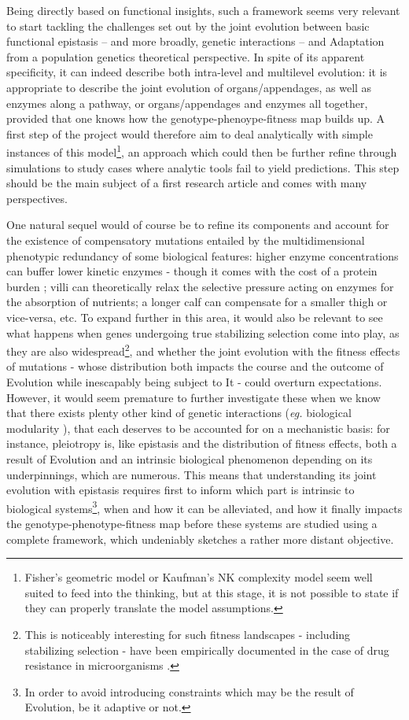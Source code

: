 \documentclass[11pt,onecolumn]{article}
\begin{document}
Being directly based on functional insights, such a framework seems very relevant to start tackling the challenges set out by the joint evolution between basic functional epistasis -- and more broadly, genetic interactions -- and Adaptation from a population genetics theoretical perspective. In spite of its apparent specificity, it can indeed describe both intra-level and multilevel evolution: it is appropriate to describe the joint evolution of organs/appendages, as well as enzymes along a pathway, or organs/appendages and enzymes all together, provided that one knows how the genotype-phenoype-fitness map builds up. A first step of the project would therefore aim to deal analytically with simple instances of this model\footnote{Fisher's geometric model or Kaufman's NK complexity model seem well suited to feed into the thinking, but at this stage, it is not possible to state if they can properly translate the model assumptions.}, an approach which could then be further refine through simulations to study cases where analytic tools fail to yield predictions. This step should be the main subject of a first research article and comes with many perspectives.

One natural sequel would of course be to refine its components and account for the existence of compensatory mutations entailed by the multidimensional phenotypic redundancy of some biological features: higher enzyme concentrations can buffer lower kinetic enzymes - though it comes with the cost of a protein burden \citep{Koch83,Dill11,Kafri16}; villi can theoretically relax the selective pressure acting on enzymes for the absorption of nutrients; a longer calf can compensate for a smaller thigh or vice-versa, etc. To expand further in this area, it would also be relevant to see what happens when genes undergoing true stabilizing selection come into play, as they are also widespread\footnote{This is noticeably interesting for such fitness landscapes - including stabilizing selection - have been empirically documented in the case of drug resistance in microorganisms \citep{Ford20}.}, and whether the joint evolution with the fitness effects of mutations - whose distribution both impacts the course and the outcome of Evolution while inescapably being subject to It - could overturn expectations. However, it would seem premature to further investigate these   when we know that there exists plenty other kind of genetic interactions (\textit{eg.} biological modularity \citep{Wagner96}), that each deserves to be accounted for on a mechanistic basis: for instance, pleiotropy is, like epistasis and the distribution of fitness effects, both a result of Evolution and an intrinsic biological phenomenon \citep{Wagner96,Chesmore16} depending on its underpinnings, which are numerous. This means that understanding its joint evolution with epistasis requires first to inform which part is intrinsic to biological systems\footnote{In order to avoid introducing constraints which may be the result of Evolution, be it adaptive or not.}, when and how it can be alleviated, and how it finally impacts the genotype-phenotype-fitness map before these systems are studied using a complete framework, which undeniably sketches a rather more distant objective.
\end{document}
